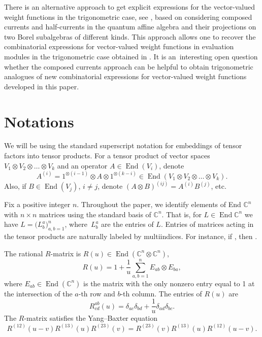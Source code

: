 \documentclass[pdftex]{sigma}
\numberwithin{equation}{section}
\DeclareMathOperator{\End}{End}
\begin{document}
There is an alternative approach to get explicit expressions for the vector-valued weight
functions in the trigonometric case, see \cite{KP,KPT, OPS}, based on considering composed
currents and half-currents in the quantum affine algebra and their projections on two Borel
subalgebras of different kinds. This approach allows one to recover the combinatorial expressions
for vector-valued weight functions in evaluation modules in the trigonometric case obtained
in \cite{TVC}. It is an~interesting open question whether the composed currents approach
can be helpful to obtain trigonometric analogues of new combinatorial expressions for
vector-valued weight functions developed in this paper.

\section{Notations}\label{notation}
We will be using the standard superscript notation for embeddings of tensor factors into tensor products. For a tensor product of vector spaces $V_1\otimes V_2\otimes\dots\otimes V_k$ and an operator $A\in \End (V_i)$, denote
\begin{equation*}
A^{(i)}=1^{\otimes(i-1)} \otimes A \otimes 1^{\otimes(k-i)} \in \End(V_1\otimes V_2\otimes\dots\otimes V_k). \end{equation*}
Also, if $B\in \End (V_j)$, $i\neq j$, denote $(A\otimes B)^{(ij)}=A^{(i)}B^{(j)}$, etc.

Fix a positive integer $n$. Throughout the paper, we identify elements of End $\mathbb{C}^n$ with $n\times n$ matrices using the standard basis of $\mathbb{C}^n$. That is, for $L\in \End \mathbb{C}^n$ we have $ L= \bigl( L_b^a \bigr)_{a,b=1}^n$, where~$L_b^a$ are the entries of $L$. Entries of matrices acting in the tensor products  are naturally labeled by multiindices. For instance, if \smash{$M\in \End(\mathbb{C}^n\otimes \mathbb{C}^n)$}, then .

The rational $R$-matrix is $R(u)\in \End (\mathbb{C}^n\otimes \mathbb{C}^n)$,
\begin{equation}\label{rmatrix}
R(u)=1+\frac{1}{u}\sum_{a, b=1}^{n} E_{a b} \otimes E_{b a},
\end{equation}
where $ E_{a b} \in \End\left(\mathbb{C}^{n}\right) $ is the matrix with the only nonzero entry equal to 1 at the intersection of the $a$-th row and $b$-th column. The entries of $R(u)$ are
\begin{equation*}
R^{ab}_{cd}(u)= \delta_{ac}\delta_{bd} +\frac{1}{u}\delta_{ad}\delta_{bc}.
\end{equation*}
The $R$-matrix satisfies the Yang--Baxter equation
\begin{equation}\label{YB} R^{(12)}(u-v) R^{(13)}(u) R^{(23)}(v)=R^{(23)}(v) R^{(13)}(u) R^{(12)}(u-v).\end{equation}
\end{document}
